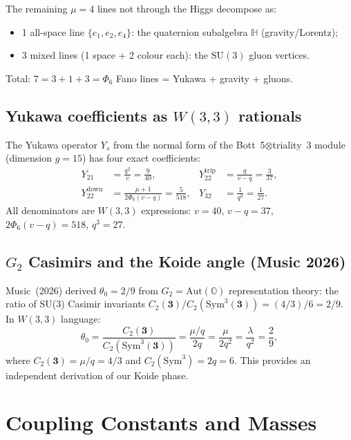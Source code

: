 \documentclass[12pt,a4paper]{article}
\theoremstyle{definition}
\newcommand{\SU}{\mathrm{SU}}
\newcommand{\Aut}{\mathrm{Aut}}
\newcommand{\Phisix}{\Phi_6}
\newcommand{\HH}{\mathbb{H}}
\newcommand{\OO}{\mathbb{O}}
\begin{document}
The remaining $\mu=4$ lines not through the Higgs decompose as:
\begin{itemize}[nosep]
\item 1 all-space line $\{e_1,e_2,e_4\}$: the quaternion subalgebra $\HH$ (gravity/Lorentz);
\item 3 mixed lines (1 space + 2 colour each): the $\SU(3)$ gluon vertices.
\end{itemize}
Total: $7=3+1+3=\Phisix$ Fano lines = Yukawa + gravity + gluons.

\subsection{Yukawa coefficients as \texorpdfstring{$W(3,3)$}{W(3,3)} rationals}

The Yukawa operator $Y_s$ from the normal form of the
Bott~5$\otimes$triality~3 module (dimension $g=15$) has four exact coefficients:
\begin{align}
  Y_{21} &= \frac{q^2}{v} = \frac{9}{40},&
  Y_{22}^{\mathrm{trip}} &= \frac{q}{v-q} = \frac{3}{37},\nonumber\\
  Y_{22}^{\mathrm{down}} &= \frac{\mu+1}{2\Phisix(v-q)} = \frac{5}{518},&
  Y_{32} &= \frac{1}{q^3} = \frac{1}{27}.
\end{align}
All denominators are $W(3,3)$ expressions: $v=40$, $v-q=37$,
$2\Phisix(v-q)=518$, $q^3=27$.

\subsection{\texorpdfstring{$G_2$}{G2} Casimirs and the Koide angle (Music 2026)}

Music~(2026) derived $\theta_0=2/9$ from $G_2=\Aut(\OO)$ representation
theory: the ratio of SU(3) Casimir invariants
$C_2(\mathbf{3})/C_2(\mathrm{Sym}^3\!(\mathbf{3})) = (4/3)/6 = 2/9$.
In $W(3,3)$ language:
\begin{equation}
  \theta_0 = \frac{C_2(\mathbf{3})}{C_2(\mathrm{Sym}^3(\mathbf{3}))}
  = \frac{\mu/q}{2q} = \frac{\mu}{2q^2}
  = \frac{\lambda}{q^2} = \frac{2}{9},
\end{equation}
where $C_2(\mathbf{3})=\mu/q=4/3$ and $C_2(\mathrm{Sym}^3)=2q=6$.
This provides an independent derivation of our Koide phase.

\section{Coupling Constants and Masses}
\label{sec:couplings}
\end{document}
